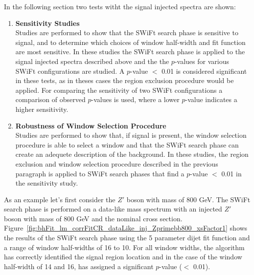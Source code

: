 \newpage
\noindent
In the following section two tests witht the signal injected spectra are shown:
\begin{enumerate}
  \item\textbf{Sensitivity Studies}\\
  Studies are performed to show that the SWiFt search phase is sensitive to signal,
  and to determine which choices of window half-width and fit function are most sensitive.
  In these studies the SWiFt search phase is applied to  the signal injected spectra described above and the
  the \bh{} \mbox{$p$-value}s for various SWiFt configurations are studied.
  A \mbox{$p$-value} $<$ 0.01 is considered significant in these tests,
  as in theses cases the region exclusion procedure would be applied.
  For comparing the sensitivity of two SWiFt configurations a comparison of
  observed \bh{} \mbox{$p$-value}s is used, where a lower \mbox{$p$-value} indicates a higher sensitivity.\vspace{1em}
  
  \item\textbf{Robustness of Window Selection Procedure}\\
    Studies are performed to show that, if signal is present, the window selection procedure is able to select a window and
    that the SWiFt search phase can create an adequete description of the background.
    In these studies, the region exclusion and window selection procedure described in the previous paragraph is applied
    to SWiFt search phases that find a \bh{} \mbox{$p$-value} $<$ 0.01 in the sensitivity study.
\end{enumerate}




As an example let's first consider the $Z'$ boson with mass of 800 GeV.
The  SWiFt search phase is performed on a data-like mass spectrum
with an injected  $Z'$ boson with mass of 800 GeV and the nominal cross section.
Figure~\ref{fig:bhFit_lm_corrFitCR_dataLike_inj_Zprimebb800_xsFactor1}
shows the results of the SWiFt search phase
using the 5 parameter dijet fit function and a range of window half-widths of 16 to 10.
For all window widths, the \bh{} algorithm has correctly identified the signal region location
and in the case of the window half-width of 14 and 16, has assigned a significant \mbox{\mbox{$p$-value}} ($<$ 0.01).

